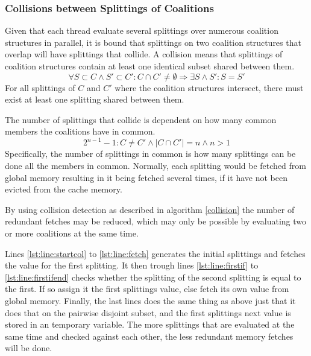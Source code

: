 \documentclass{llncs}
\begin{document}
\subsubsection{Collisions between Splittings of Coalitions} \label{sectionsplit}
Given that each thread evaluate several splittings over numerous coalition structures in parallel, 
it is bound that splittings on two coalition structures that overlap will have splittings that collide.
A collision means that splittings of coalition structures contain at least one identical subset shared between them.
\begin{displaymath}\forall S\subset C \wedge S' \subset C' : C \cap C' \neq \emptyset \Rightarrow \exists S \wedge S' : S = S'\end{displaymath}
For all splittings of $C$ and $C'$ where the coalition structures intersect, there must exist at least one splitting shared between them.

The number of splittings that collide is dependent on how many common members the coalitions have in common.
\begin{displaymath}2^{n-1}-1:C\neq C'\wedge |C \cap C'| = n \wedge n > 1 \end{displaymath}
Specifically, the number of splittings in common is how many splittings
can be done all the members in common.
Normally, each splitting would be fetched from global memory resulting in it being fetched several times, 
if it have not been evicted from the cache memory.

By using collision detection as described in algorithm \ref{collision} the number of redundant fetches may be reduced,
which may only be possible by evaluating two or more coalitions at the same time. 

Lines \ref{lst:line:startcol} to \ref{lst:line:fetch} generates
the initial splittings and fetches the value for the first splitting. It then trough lines \ref{lst:line:firstif} to \ref{lst:line:firstifend}
checks whether the splitting of the second splitting is equal to the first. 
If so assign it the first splittings value, else fetch its own value from global memory. 
Finally, the last lines does the same thing as above just that it does that on the pairwise disjoint subset, 
and the first splittings next value is stored in an temporary variable. 
The more splittings that are evaluated at the same time and checked against each other, the less redundant memory fetches will be done.
\end{document}
